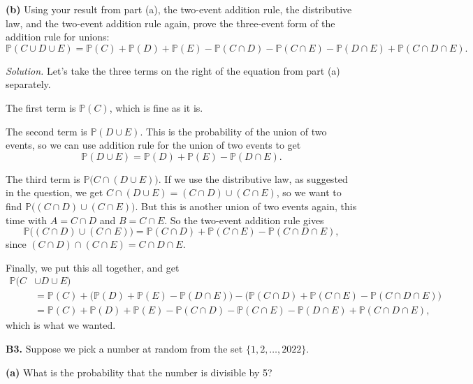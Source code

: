 \documentclass[
  a4paper,
]{book}
\theoremstyle{definition}
\theoremstyle{definition}
\theoremstyle{definition}
\theoremstyle{definition}
\theoremstyle{remark}
\begin{document}
\textbf{(b)} Using your result from part (a), the two-event addition rule, the distributive law, and the two-event addition rule again, prove the three-event form of the addition rule for unions:
\[
  \mathbb P(C \cup D \cup E) = \mathbb P(C) + \mathbb P(D) + \mathbb P(E) 
  - \mathbb P(C \cap D) - \mathbb P(C \cap E) - \mathbb P(D \cap E) + \mathbb P(C \cap D \cap E) .
\]

\begin{myanswers}
\emph{Solution.}
Let's take the three terms on the right of the equation from part (a) separately.

The first term is \(\mathbb P(C)\), which is fine as it is.

The second term is \(\mathbb P(D \cup E)\). This is the probability of the union of two events, so we can use addition rule for the union of two events to get
\[ \mathbb P(D \cup E) = \mathbb P(D) + \mathbb P(E) - \mathbb P(D \cap E) . \]

The third term is \(\mathbb P\big(C \cap (D \cup E)\big)\). If we use the distributive law, as suggested in the question, we get \(C \cap (D \cup E) = (C \cap D) \cup (C\cap E)\), so we want to find \(\mathbb P\big((C \cap D) \cup (C\cap E)\big)\). But this is another union of two events again, this time with \(A = C \cap D\) and \(B = C \cap E\). So the two-event addition rule gives
\[ \mathbb P\big((C \cap D) \cup (C\cap E)\big) = \mathbb P(C \cap D) + \mathbb P(C \cap E) - \mathbb P(C \cap D \cap E) , \]
since \((C \cap D) \cap (C \cap E) = C \cap D \cap E\).

Finally, we put this all together, and get
\begin{align*}
  \mathbb P(C &\cup D \cup E) \\
  &= \mathbb P(C) + \big(\mathbb P(D) + \mathbb P(E) - \mathbb P(D \cap E)\big) - \big(\mathbb P(C \cap D) + \mathbb P(C \cap E) - \mathbb P(C \cap D \cap E)\big) \\
  &= \mathbb P(C) + \mathbb P(D) + \mathbb P(E) - \mathbb P(C \cap D) - \mathbb P(C \cap E) - \mathbb P(D \cap E) + \mathbb P(C \cap D \cap E) , 
\end{align*}
which is what we wanted.

\end{myanswers}

\textbf{B3.} Suppose we pick a number at random from the set \(\{1, 2, \dots, 2022\}\).

\textbf{(a)} What is the probability that the number is divisible by 5?
\end{document}
